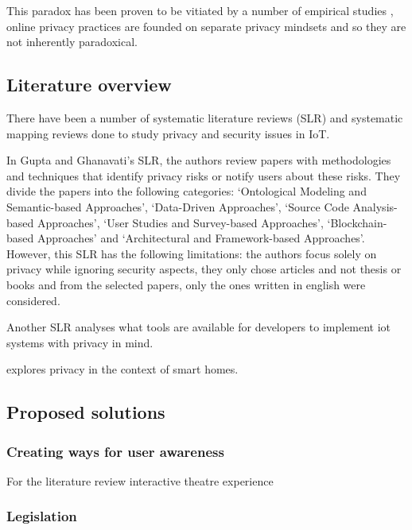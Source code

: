 \documentclass[conference]{IEEEtran}
\begin{document}
This paradox has been proven to be vitiated by a number of empirical studies \cite{dienlin2015privacy, xie2019consumers, SCHWAIG20131, sannon2018privacy},
online privacy practices are founded on separate privacy mindsets and so they are not inherently paradoxical.

\subsection{Literature overview}

There have been a number of systematic literature reviews (SLR) \cite{shi2020applications, atlam2020iot, LoukilPrivacy, SICARI2015146, vcolakovic2018internet, chitanya2018robustness, chanal2020security, LinSurvey, Kraijaksurvey}
and systematic mapping reviews \cite{porras2018security, ahmed2019aspects}
done to study privacy and security issues in IoT.

In Gupta and Ghanavati's \cite{Gupta2022Privacy} SLR,
the authors review papers with methodologies and techniques that identify privacy risks or
notify users about these risks. They divide the papers into the following
categories: `Ontological Modeling and Semantic-based Approaches', `Data-Driven Approaches',
`Source Code Analysis-based Approaches', `User Studies and Survey-based Approaches',
`Blockchain-based Approaches' and `Architectural and Framework-based Approaches'.
However, this SLR has the following limitations: the authors focus solely on privacy
while ignoring security aspects, they only chose articles and not thesis or books and from
the selected papers, only the ones written in english were considered.

Another SLR \cite{Kuhtreiber2022survey} analyses what tools are available for developers
to implement iot systems with privacy in mind.

\cite{AbbottPrivacy} explores privacy in the context of smart homes.

\subsection{Proposed solutions}

\subsubsection{Creating ways for user awareness}

For the literature review interactive theatre experience \cite{SkirpanPrivacy}

\subsubsection{Legislation}
\end{document}
